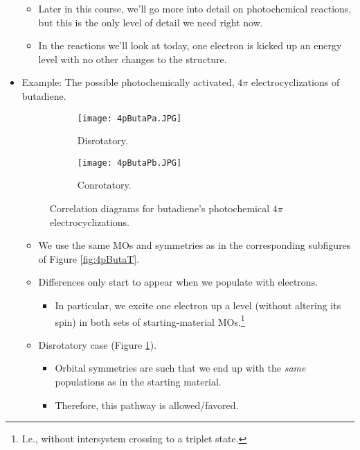 \documentclass[../notes.tex]{subfiles}
\begin{document}
\begin{itemize}
    \begin{itemize}
        \item Later in this course, we'll go more into detail on photochemical reactions, but this is the only level of detail we need right now.
        \item In the reactions we'll look at today, one electron is kicked up an energy level with no other changes to the structure.
    \end{itemize}
    \pagebreak
    \item Example: The possible photochemically activated, $4\pi$ electrocyclizations of butadiene.
    \begin{figure}[h!]
        \centering
        \begin{subfigure}[b]{0.3\linewidth}
            \centering
            \texttt{[image: 4pButaPa.JPG]}
            \caption{Disrotatory.}
            \label{fig:4pButaPa}
        \end{subfigure}
        \begin{subfigure}[b]{0.3\linewidth}
            \centering
            \texttt{[image: 4pButaPb.JPG]}
            \caption{Conrotatory.}
            \label{fig:4pButaPb}
        \end{subfigure}
        \caption{Correlation diagrams for butadiene's photochemical $4\pi$ electrocyclizations.}
        \label{fig:4pButaP}
    \end{figure}
    \begin{itemize}
        \item We use the same MOs and symmetries as in the corresponding subfigures of Figure \ref{fig:4pButaT}.
        \item Differences only start to appear when we populate with electrons.
        \begin{itemize}
            \item In particular, we excite one electron up a level (without altering its spin) in both sets of starting-material MOs.\footnote{I.e., without intersystem crossing to a triplet state.}
        \end{itemize}
        \item Disrotatory case (Figure \ref{fig:4pButaPa}).
        \begin{itemize}
            \item Orbital symmetries are such that we end up with the \emph{same} populations as in the starting material.
            \item Therefore, this pathway is allowed/favored.

\end{itemize}
\end{itemize}
\end{itemize}
\end{document}
